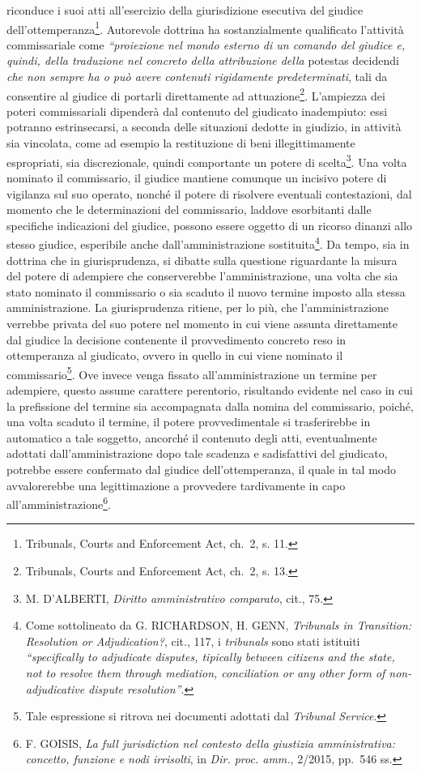 \documentclass[12pt,it,a4paper,]{report}
\begin{document}
riconduce i suoi atti all'esercizio della giurisdizione esecutiva del
giudice dell'ottemperanza\footnote{Tribunals, Courts and Enforcement
  Act, ch.~2, s. 11.}. Autorevole dottrina ha sostanzialmente
qualificato l'attività commissariale come \emph{``proiezione nel mondo
esterno di un comando del giudice e, quindi, della traduzione nel
concreto della attribuzione della} potestas decidendi \emph{che non
sempre ha o può avere contenuti rigidamente predeterminati}, tali da
consentire al giudice di portarli direttamente ad attuazione\footnote{Tribunals,
  Courts and Enforcement Act, ch.~2, s. 13.}. L'ampiezza dei poteri
commissariali dipenderà dal contenuto del giudicato inadempiuto: essi
potranno estrinsecarsi, a seconda delle situazioni dedotte in giudizio,
in attività sia vincolata, come ad esempio la restituzione di beni
illegittimamente espropriati, sia discrezionale, quindi comportante un
potere di scelta\footnote{M. D'ALBERTI, \emph{Diritto amministrativo
  comparato}, cit., 75.}. Una volta nominato il commissario, il giudice
mantiene comunque un incisivo potere di vigilanza sul suo operato,
nonché il potere di risolvere eventuali contestazioni, dal momento che
le determinazioni del commissario, laddove esorbitanti dalle specifiche
indicazioni del giudice, possono essere oggetto di un ricorso dinanzi
allo stesso giudice, esperibile anche dall'amministrazione
sostituita\footnote{Come sottolineato da G. RICHARDSON, H. GENN,
  \emph{Tribunals in Transition: Resolution or Adjudication?}, cit.,
  117, i \emph{tribunals} sono stati istituiti \emph{``specifically to
  adjudicate disputes, tipically between citizens and the state, not to
  resolve them through mediation, conciliation or any other form of
  non-adjudicative dispute resolution''}.}. Da tempo, sia in dottrina
che in giurisprudenza, si dibatte sulla questione riguardante la misura
del potere di adempiere che conserverebbe l'amministrazione, una volta
che sia stato nominato il commissario o sia scaduto il nuovo termine
imposto alla stessa amministrazione. La giurisprudenza ritiene, per lo
più, che l'amministrazione verrebbe privata del suo potere nel momento
in cui viene assunta direttamente dal giudice la decisione contenente il
provvedimento concreto reso in ottemperanza al giudicato, ovvero in
quello in cui viene nominato il commissario\footnote{Tale espressione si
  ritrova nei documenti adottati dal \emph{Tribunal Service}.}. Ove
invece venga fissato all'amministrazione un termine per adempiere,
questo assume carattere perentorio, risultando evidente nel caso in cui
la prefissione del termine sia accompagnata dalla nomina del
commissario, poiché, una volta scaduto il termine, il potere
provvedimentale si trasferirebbe in automatico a tale soggetto, ancorché
il contenuto degli atti, eventualmente adottati dall'amministrazione
dopo tale scadenza e sadisfattivi del giudicato, potrebbe essere
confermato dal giudice dell'ottemperanza, il quale in tal modo
avvalorerebbe una legittimazione a provvedere tardivamente in capo
all'amministrazione\footnote{F. GOISIS, \emph{La full jurisdiction nel
  contesto della giustizia amministrativa: concetto, funzione e nodi
  irrisolti}, in \emph{Dir. proc. amm.}, 2/2015, pp.~546 ss.}.
\end{document}
